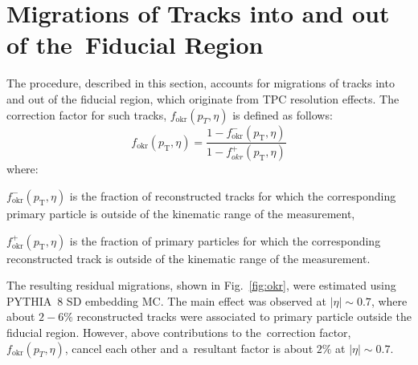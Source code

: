 \section{Migrations of Tracks into and out of the~Fiducial Region}\label{section:star_okr}
The procedure, described in this section, accounts for migrations of tracks into and out of the fiducial region, which originate from TPC resolution effects. The correction factor for such tracks, $f_\textrm{okr}(p_T, \eta)$ is defined as follows:
\begin{equation}
f_\textrm{okr}(p_\textrm{T}, \eta)=\frac{1-f_\textrm{okr}^-(p_\textrm{T}, \eta)}{1-f_{okr}^+(p_\textrm{T}, \eta)}
\end{equation}
where:
\begin{description}
	\item $f_\textrm{okr}^-(p_\textrm{T}, \eta)$ is the fraction of reconstructed tracks for which the corresponding primary particle is outside of the kinematic range of the measurement,
	\item $f_\textrm{okr}^+(p_\textrm{T}, \eta)$  is the fraction of primary particles for which the corresponding reconstructed track is outside of the kinematic range of the measurement.
\end{description}

The resulting residual migrations, shown in Fig.~\ref{fig:okr}, were estimated using PYTHIA~8 SD embedding MC. The main effect  was observed  at $|\eta| \sim 0.7$, where about $2-6\%$ reconstructed tracks were associated to primary particle outside the fiducial region.  However, above contributions to the~correction factor, $f_\textrm{okr}(p_T, \eta)$, cancel each other and  a~resultant factor is about $2\%$ at $|\eta| \sim 0.7$.

